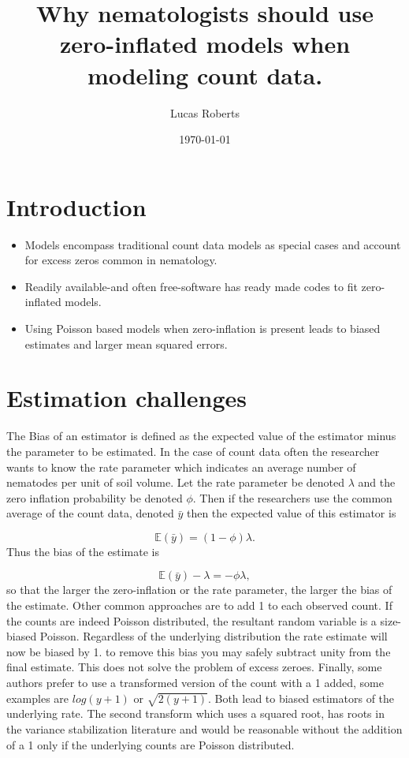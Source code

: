 \documentclass{article}
\author{Lucas Roberts}
\date{\today}
\begin{document}
\title{
Why nematologists should use zero-inflated models when modeling count data.  
}

\maketitle

\section{Introduction}


\begin{itemize}
\item Models encompass traditional count data models as special cases and account for excess zeros common in nematology. 
\item Readily available-and often free-software has ready made codes to fit zero-inflated models. 
\item Using Poisson based models when zero-inflation is present leads to biased estimates and larger mean squared errors.   
\end{itemize}

\section{Estimation challenges}

The Bias of an estimator is defined as the expected value of the estimator minus the parameter to be estimated. In the case of count data often the researcher wants to know the rate parameter which indicates an average number of nematodes per unit of soil volume. Let the rate parameter be denoted $\lambda$ and the zero inflation probability be denoted $\phi$. Then if the researchers use the common average of the count data, denoted $\bar{y}$ then the expected value of this estimator is 

\begin{equation}
\mathbb{E}(\bar{y}) = (1-\phi)\lambda.
\end{equation}
Thus the bias of the estimate is 

\begin{equation}
\mathbb{E}(\bar{y}) - \lambda = -\phi\lambda,
\end{equation}
so that the larger the zero-inflation or the rate parameter, the larger the bias of the estimate. Other common approaches are to add 1 to each observed count. If the counts are indeed Poisson distributed, the resultant random variable is a size-biased Poisson. Regardless of the underlying distribution the rate estimate will now be biased by 1. to remove this bias you may safely subtract unity from the final estimate. This does not solve the problem of excess zeroes. Finally, some authors prefer to use a transformed version of the count with a 1 added, some examples are $log(y+1)$ or $\sqrt{2(y+1)}$. Both lead to biased estimators of the underlying rate. The second transform which uses a squared root, has roots in the variance stabilization literature and would be reasonable without the addition of a 1 only if the underlying counts are Poisson distributed.  
\end{document}
